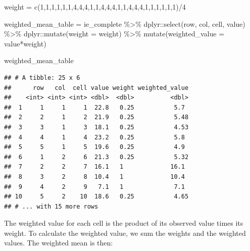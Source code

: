 \documentclass[
]{book}
\newenvironment{Shaded}{\begin{snugshade}}{\end{snugshade}}
\newcommand{\AttributeTok}[1]{\textcolor[rgb]{0.77,0.63,0.00}{#1}}
\newcommand{\DecValTok}[1]{\textcolor[rgb]{0.00,0.00,0.81}{#1}}
\newcommand{\FunctionTok}[1]{\textcolor[rgb]{0.00,0.00,0.00}{#1}}
\newcommand{\NormalTok}[1]{#1}
\newcommand{\OtherTok}[1]{\textcolor[rgb]{0.56,0.35,0.01}{#1}}
\newcommand{\SpecialCharTok}[1]{\textcolor[rgb]{0.00,0.00,0.00}{#1}}
\begin{document}
\begin{Shaded}
\begin{Highlighting}[]
\NormalTok{weight }\OtherTok{=} \FunctionTok{c}\NormalTok{(}\DecValTok{1}\NormalTok{,}\DecValTok{1}\NormalTok{,}\DecValTok{1}\NormalTok{,}\DecValTok{1}\NormalTok{,}\DecValTok{1}\NormalTok{,}\DecValTok{1}\NormalTok{,}\DecValTok{4}\NormalTok{,}\DecValTok{4}\NormalTok{,}\DecValTok{4}\NormalTok{,}\DecValTok{1}\NormalTok{,}\DecValTok{1}\NormalTok{,}\DecValTok{4}\NormalTok{,}\DecValTok{4}\NormalTok{,}\DecValTok{4}\NormalTok{,}\DecValTok{1}\NormalTok{,}\DecValTok{1}\NormalTok{,}\DecValTok{4}\NormalTok{,}\DecValTok{4}\NormalTok{,}\DecValTok{4}\NormalTok{,}\DecValTok{1}\NormalTok{,}\DecValTok{1}\NormalTok{,}\DecValTok{1}\NormalTok{,}\DecValTok{1}\NormalTok{,}\DecValTok{1}\NormalTok{,}\DecValTok{1}\NormalTok{)}\SpecialCharTok{/}\DecValTok{4}

\NormalTok{weighted\_mean\_table }\OtherTok{=}\NormalTok{ ie\_complete }\SpecialCharTok{\%\textgreater{}\%}
\NormalTok{  dplyr}\SpecialCharTok{::}\FunctionTok{select}\NormalTok{(row, col, cell, value) }\SpecialCharTok{\%\textgreater{}\%}
\NormalTok{  dplyr}\SpecialCharTok{::}\FunctionTok{mutate}\NormalTok{(}\AttributeTok{weight =}\NormalTok{ weight) }\SpecialCharTok{\%\textgreater{}\%}
  \FunctionTok{mutate}\NormalTok{(}\AttributeTok{weighted\_value =}\NormalTok{ value}\SpecialCharTok{*}\NormalTok{weight)}

\NormalTok{weighted\_mean\_table}
\end{Highlighting}
\end{Shaded}

\begin{verbatim}
## # A tibble: 25 x 6
##      row   col  cell value weight weighted_value
##    <int> <int> <int> <dbl>  <dbl>          <dbl>
##  1     1     1     1  22.8   0.25           5.7 
##  2     2     1     2  21.9   0.25           5.48
##  3     3     1     3  18.1   0.25           4.53
##  4     4     1     4  23.2   0.25           5.8 
##  5     5     1     5  19.6   0.25           4.9 
##  6     1     2     6  21.3   0.25           5.32
##  7     2     2     7  16.1   1             16.1 
##  8     3     2     8  10.4   1             10.4 
##  9     4     2     9   7.1   1              7.1 
## 10     5     2    10  18.6   0.25           4.65
## # ... with 15 more rows
\end{verbatim}

The weighted value for each cell is the product of its observed value times its weight. To calculate the weighted value, we sum the weights and the weighted values. The weighted mean is then:
\end{document}
